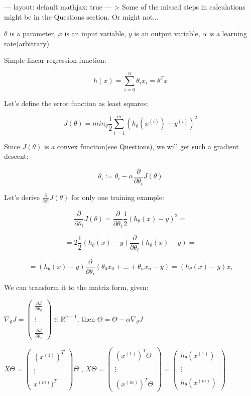 ---
layout: default
mathjax: true
---
> Some of the missed steps in calculations might be in the Questions section. Or might not...

$\theta$ is a parameter,
$x$ is an input variable,
$y$ is an output variable,
$\alpha$ is a learning rate(arbitrary)

Simple linear regression function: 

$$ h(x) = \sum_{i=0}^{n}\theta_{i}x_{i} = \theta^{T}x$$

Let's define the error function as least squares:

$$ J(\theta) = min_{\theta}\frac{1}{2}\sum_{i=1}^{m}(h_{\theta}(x^{(i)}) - y^{(i)})^{2}$$

Since $J(\theta)$ is a convex function(see Questions), we will get such a gradient descent:

$$ \theta_{i} := \theta_{i} - \alpha\frac{\partial}{\partial\theta_{i}}J(\theta)$$

Let's derive $\frac{\partial}{\partial\theta_{i}}J(\theta)$ for only one training example: 

$$\frac{\partial}{\partial\theta_{i}}J(\theta) =\frac{\partial}{\partial\theta_{i}}\frac{1}{2}(h_{\theta}(x)-y)^{2} = $$

$$=2\frac{1}{2}(h_{\theta}(x)-y)\frac{\partial}{\partial\theta_{i}}(h_{\theta}(x)-y) = $$

$$=(h_{\theta}(x)-y)\frac{\partial}{\partial\theta_{i}}(\theta_{0}x_{0}+...+\theta_{n}x_{n}-y) =(h_{\theta}(x)-y)x_{i}$$

We can transform it to the matrix form, given:

$\nabla_{\theta}J = \begin{pmatrix}\frac{\partial J}{\partial\theta_{0}} \\\\ \vdots \\\\ \frac{\partial J}{\partial\theta_{n}}\end{pmatrix} \in \mathbb{R}^{n+1}$, then $\Theta = \Theta - \alpha \nabla_{\theta}J$

$X\Theta = \begin{pmatrix}(x^{(1)})^{T} \\\\ \vdots \\\\ x^{(m)})^{T}\end{pmatrix}\Theta$ , 
$X\Theta = \begin{pmatrix}(x^{(1)})^{T}\Theta \\\\ \vdots \\\\ (x^{(m)})^{T}\Theta\end{pmatrix} = \begin{pmatrix} h_{\theta}(x^{(1)}) \\\\ \vdots \\\\ h_{\theta}(x^{(m)})\end{pmatrix}$

